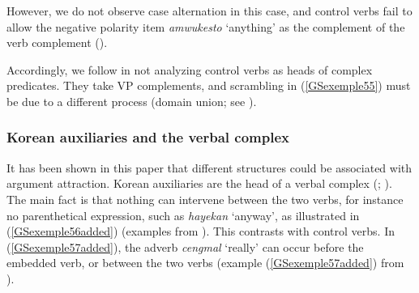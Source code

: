 {\eal
	\label{GSexemple55} 
	\label{GSexemple55a}
		
	\label{GSexemple55b}
\zl

However, we do not observe case alternation in this case, and control verbs fail to allow the negative polarity item \emph{amwukesto} `anything' as the complement of the verb complement (\citealt[91]{Kim2016a-u}).

\eal
	\label{GSexemple55added} 
	\label{GSexemple55addeda}
	
	\label{GSexemple55addedb}
\zl

Accordingly, we follow \cite{Kim2016a-u} in not analyzing control verbs as heads of complex predicates. They take VP complements, and scrambling in (\ref{GSexemple55}) must be due to a different process (domain union; see \citealt{Reape94a}).


\subsubsection{Korean auxiliaries and the verbal complex}\label{GSsection4.2.2}

It has been shown in this paper that different structures could be associated with argument attraction. Korean auxiliaries are the head of a verbal complex (\citealt{Chung98a-u}; \citealt{Kim2016a-u}). The main fact is that nothing can intervene between the two verbs, for instance no parenthetical expression, such as \emph{hayekan} `anyway', as illustrated in (\ref{GSexemple56added}) (examples from \citealt[162]{Chung98a-u}). This contrasts with control verbs. In (\ref{GSexemple57added}), the adverb \emph{cengmal} `really' can occur before the embedded verb, or between the two verbs (example (\ref{GSexemple57added}) from \citealt[93]{Kim2016a-u}).


}

